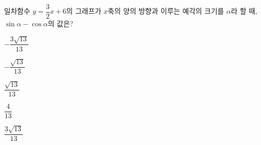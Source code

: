 일차함수 $y=\dfrac{3}{2}x+6$의 그래프가 $x$축의 양의 방향과 이루는 예각의 크기를 $\alpha$라 할 때, $\sin\alpha-\cos\alpha$의 값은?
\begin{choices32}{\rule[-3ex]{0pt}{8ex}$-\dfrac{3\sqrt{13}}{13}$}{\rule[-3ex]{0pt}{8ex}$-\dfrac{\sqrt{13}}{13}$}{\rule[-3ex]{0pt}{8ex}$\dfrac{\sqrt{13}}{13}$}{\rule[-3ex]{0pt}{8ex}$\dfrac{4}{13}$}{\rule[-3ex]{0pt}{8ex}$\dfrac{3\sqrt{13}}{13}$}\end{choices32}
